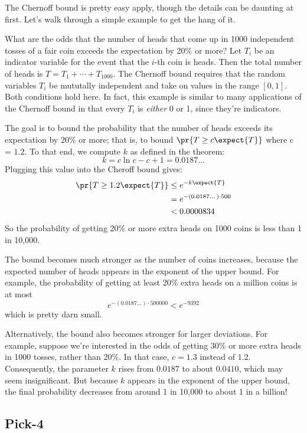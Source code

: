 The Chernoff bound is pretty easy apply, though the details can be
daunting at first.  Let's walk through a simple example to get the
hang of it.

What are the odds that the number of heads that come up in 1000
independent tosses of a fair coin exceeds the expectation by 20\% or
more?  Let $T_i$ be an indicator variable for the event that the
$i$-th coin is heads.  Then the total number of heads is $T = T_1 +
\cdots + T_{1000}$.  The Chernoff bound requires that the random
variables $T_i$ be mututally independent and take on values in the
range $[0, 1]$.  Both conditions hold here.  In fact, this example is
similar to many applications of the Chernoff bound in that every $T_i$
is {\em either} 0 or 1, since they're indicators.

The goal is to bound the probability that the number of heads exceeds
its expectation by 20\% or more; that is, to bound $\pr{T \geq c
  \expect{T}}$ where c = $1.2$.  To that end, we compute $k$ as
defined in the theorem:
\[
k = c \ln c - c + 1 = 0.0187\dots
\]
Plugging this value into the Cheroff bound gives:
\begin{align*}
\pr{T \geq 1.2 \expect{T}} & \leq  e^{- k \expect{T}} \\
  & = e^{- (0.0187\dots) \cdot 500} \\
  & <  0.0000834
\end{align*}
So the probability of getting 20\% or more extra heads on 1000 coins is
less than 1 in 10,000.

The bound becomes much stronger as the number of coins increases,
because the expected number of heads appears in the exponent of the
upper bound.  For example, the probability of getting at least 20\%
extra heads on a million coins is at most
\[
e^{- (0.0187\dots) \cdot 500000} < e^{-9392}
\]
which is pretty darn small.

Alternatively, the bound also becomes stronger for larger deviations.
For example, suppose we're interested in the odds of getting 30\% or
more extra heads in 1000 tosses, rather than 20\%.  In that case,
$c= 1.3$ instead of $1.2$.  Consequently, the parameter $k$ rises from
$0.0187$ to about $0.0410$, which may seem insignificant.  But because
$k$ appears in the exponent of the upper bound, the final probability
decreases from around 1 in 10,000 to about 1 in a billion!

\subsection{Pick-4}

